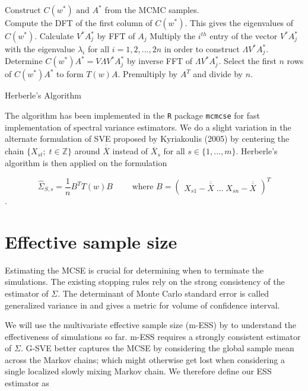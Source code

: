 \documentclass[11pt]{article}
\theoremstyle{remark}
\begin{document}
\begin{algorithm}[htbp]
\DontPrintSemicolon
\SetAlgoLined
Construct $C(w^*) \textrm{ and } A^*$ from the MCMC samples.\\ Compute the DFT of the first column of $C(w^*)$. This gives the eigenvalues of $C(w^*)$.\;
    { 
    Calculate $V^*A_j^*$ by FFT of $A_j$\;
    Multiply the $i^{th}$ entry of the vector $V^* A_j^*$ with the eigenvalue $\lambda_i$ for all $i = 1, 2, ..., 2n$ in order to construct $\Lambda V^* A_j^*$.\;
    Determine $C(w^*)A^* = V \Lambda V^* A_j^*$ by inverse FFT of $\Lambda V^* A_j^*$.\;
    }
 Select the first $n$ rows of $C(w^*)A^*$ to form $T(w)A$.\;
 Premultiply by $A^T$ and divide by $n$.
 \caption{Herberle's Algorithm}
\end{algorithm}

The algorithm has been implemented in the \texttt{R} package \texttt{mcmcse} for fast implementation of spectral variance estimators. We do a slight variation in the alternate formulation of SVE proposed by Kyriakoulis (2005) by centering the chain $\{X_{st}; \; t \in \mathbb{Z}\}$ around $\overline{\overline{X}}$ instead of $\overline{X}_s$ for all $s \in \{1, ..., m\}$. Herberle's algorithm is then applied on the formulation

\[
\hat{\Sigma}_{S,s} = \dfrac{1}{n}B^T T(w) B \qquad \textrm{ where } B = 
\begin{pmatrix}
    X_{s1} - \overline{\overline{X}} \; \dots \; X_{sn} - \overline{\overline{X}}\end{pmatrix}^T
\].


\section{Effective sample size} \label{sec:ess}

Estimating the MCSE is crucial for determining when to terminate the simulations. The existing stopping rules rely on the strong consistency of the estimator of $\Sigma$. The determinant of Monte Carlo standard error is called generalized variance in  \cite{wilks1932certain} and gives a metric for volume of confidence interval. 

We will use the multivariate effective sample size (m-ESS) by \cite{vats2019multivariate} to understand the effectiveness of simulations so far. m-ESS requires a strongly consistent estimator of $\Sigma$. G-SVE better captures the MCSE by considering the global sample mean across the Markov chains; which might otherwise get lost when considering a single localized slowly mixing Markov chain. We therefore define our ESS estimator as
\end{document}
